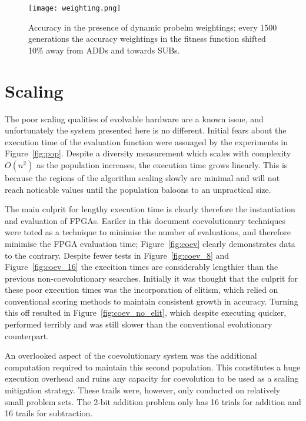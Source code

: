 \begin{figure}
	\centering
	\texttt{[image: weighting.png]}
	\caption[Accuracy in the presence of dynamic probelm weightings]
	{Accuracy in the presence of dynamic probelm weightings;
		every 1500 generations the accuracy weightings in the fitness
	function shifted 10\% away from ADDs and towards SUBs.}
\end{figure}

\section{Scaling \label{s:scaling}}

The poor scaling qualities of evolvable hardware are a known issue, and
unfortunately the system presented here is no different. Initial fears
about the execution time of the evaluation function were assuaged by
the experiments in Figure~\ref{fig:pop}. Despite a diversity measurement
which scales with complexity $O(n^2)$ as the population increases, the
execution time grows linearly. This is because the regions of the algorithm
scaling slowly are minimal and will not reach noticable values until the
population baloons to an unpractical size.

The main culprit for lengthy execution time is clearly therefore the
instantiation and evaluation of FPGAs. Eariler in this document coevolutionary
techniques were toted as a technique to minimise the number of evaluations,
and therefore minimise the FPGA evaluation time; Figure~\ref{fig:coev}
clearly demonstrates data to the contrary. Despite fewer tests in
Figure~\ref{fig:coev_8} and Figure~\ref{fig:coev_16} the execition times
are considerably lengthier than the previous non-coevolutionary searches.
Initially it was thought that the culprit for these poor execution times
was the incorporation of elitism, which relied on conventional scoring
methods to maintain consistent growth in accuracy. Turning this off
resulted in Figure~\ref{fig:coev_no_elit}, which despite executing quicker,
performed terribly and was still slower than the conventional evolutionary
counterpart.

An overlooked aspect of the coevolutionary system was the additional computation
required to maintain this second population. This constitutes a huge execution
overhead and ruins any capacity for coevolution to be used as a scaling mitigation
strategy. These trails were, however, only conducted on relatively small problem
sets. The 2-bit addition problem only has 16 trials for addition and 16 trails
for subtraction.

